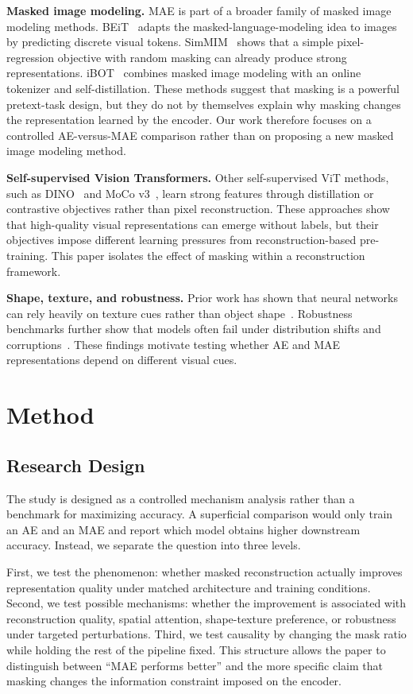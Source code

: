\documentclass[10pt,twocolumn,letterpaper]{article}
\begin{document}
\textbf{Masked image modeling.}
MAE is part of a broader family of masked image modeling methods. BEiT~\cite{bao2022beit} adapts the masked-language-modeling idea to images by predicting discrete visual tokens. SimMIM~\cite{xie2022simmim} shows that a simple pixel-regression objective with random masking can already produce strong representations. iBOT~\cite{zhou2022ibot} combines masked image modeling with an online tokenizer and self-distillation. These methods suggest that masking is a powerful pretext-task design, but they do not by themselves explain why masking changes the representation learned by the encoder. Our work therefore focuses on a controlled AE-versus-MAE comparison rather than on proposing a new masked image modeling method.

\textbf{Self-supervised Vision Transformers.}
Other self-supervised ViT methods, such as DINO~\cite{caron2021dino} and MoCo v3~\cite{chen2021mocov3}, learn strong features through distillation or contrastive objectives rather than pixel reconstruction. These approaches show that high-quality visual representations can emerge without labels, but their objectives impose different learning pressures from reconstruction-based pre-training. This paper isolates the effect of masking within a reconstruction framework.

\textbf{Shape, texture, and robustness.}
Prior work has shown that neural networks can rely heavily on texture cues rather than object shape~\cite{geirhos2019imagenet}. Robustness benchmarks further show that models often fail under distribution shifts and corruptions~\cite{hendrycks2019robustness}. These findings motivate testing whether AE and MAE representations depend on different visual cues.

\section{Method}

\subsection{Research Design}

The study is designed as a controlled mechanism analysis rather than a benchmark for maximizing accuracy. A superficial comparison would only train an AE and an MAE and report which model obtains higher downstream accuracy. Instead, we separate the question into three levels.

First, we test the phenomenon: whether masked reconstruction actually improves representation quality under matched architecture and training conditions. Second, we test possible mechanisms: whether the improvement is associated with reconstruction quality, spatial attention, shape-texture preference, or robustness under targeted perturbations. Third, we test causality by changing the mask ratio while holding the rest of the pipeline fixed. This structure allows the paper to distinguish between ``MAE performs better'' and the more specific claim that masking changes the information constraint imposed on the encoder.
\end{document}
